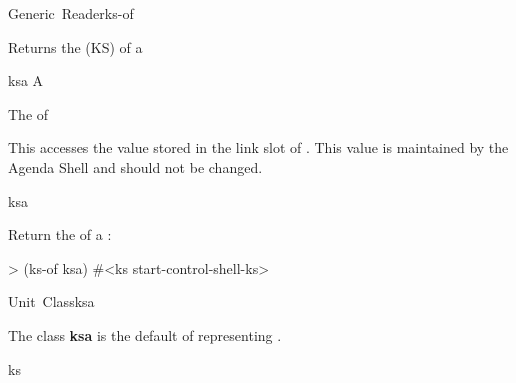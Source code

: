\documentclass[10pt,twoside,english,pdftex]{article}
\begin{document}

\begin{functiondoc}{Generic~Reader}{ks-of}{ 
    \returns{} }
%
%
%

\fnsyntax

\fnpurpose Returns the  (KS) 
of a 

\fnmethods
{}

\fnpackage {}

\fnmodule {}

\fnargs
\begin{args}{ksa}
\arg[ksa] A 
\end{args}

\fnreturns The   of 
  
\fndescription 
This  accesses the value stored in the
 link slot of .  This value is
maintained by the Agenda Shell and should not be changed.

\begin{alsos}{ksa}
\also[ks]
\also[ksa]
\end{alsos}

\fnexample
Return the  of a :
%
\W\supp
\begin{example}
> (ks-of ksa)
#<ks start-control-shell-ks>
\end{example}

\end{functiondoc}


\begin{functiondoc}{Unit~Class}{ksa}{}
%
%

\fnsyntax

\fnpackage {}

\fnmodule {}

\fndescription 
The class \textbf{ksa} is the default  of
 representing .

\begin{alsos}{ks}
\also[ks]
\end{alsos}

\end{functiondoc}
\end{document}
